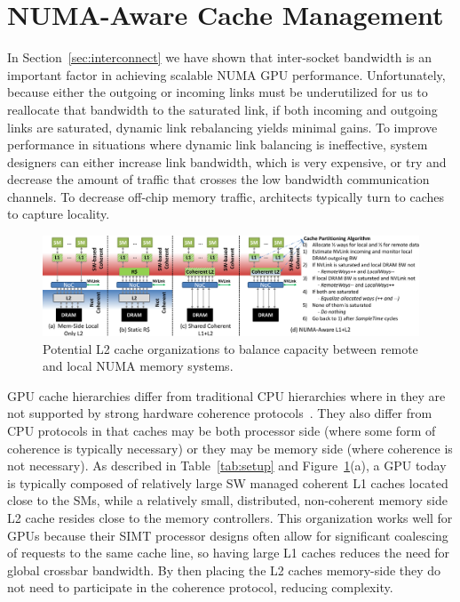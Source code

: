 \vspace{-0.1in}
\section{NUMA-Aware Cache Management}
\label{sec:caches}
In Section~\ref{sec:interconnect} we have shown that inter-socket bandwidth is an
important factor in achieving scalable NUMA GPU performance.
Unfortunately, because either the outgoing or incoming links must be underutilized
for us to reallocate that bandwidth to the saturated link, if both incoming and
outgoing links are saturated, dynamic link rebalancing yields minimal gains.
To improve performance in situations where dynamic link balancing is ineffective,
system designers can either increase link bandwidth, which is very expensive,
or try and decrease the amount of traffic that crosses the low bandwidth
communication channels.  To decrease off-chip memory traffic, architects typically
turn to caches to capture locality.

\begin{figure}[t]
    \centering
    \includegraphics[width=1.0\textwidth]{figures/cache_configurations_static_dynamic.pdf}
    \caption{Potential L2 cache organizations to balance capacity between remote and
    local NUMA memory systems.}
    \label{fig:cacheorg}
            \vspace{-.2in}
\end{figure}

GPU cache hierarchies differ from traditional CPU hierarchies where in they 
are not supported by strong hardware coherence protocols~\cite{singh2013cache}. 
They also differ from CPU protocols in that caches may be both processor side 
(where some form of 
coherence is typically necessary) or they may be memory side (where coherence 
is not necessary).  As described in Table~\ref{tab:setup} and
Figure~\ref{fig:cacheorg}(a), a GPU today is typically composed of relatively 
large SW managed coherent L1 caches located close to the SMs, while a relatively small, 
distributed, 
non-coherent memory side L2 cache resides close to the memory controllers.  
This organization works well for GPUs 
because their SIMT processor designs often allow for significant coalescing 
of requests to the same cache line, so having large L1 caches reduces the 
need for global crossbar bandwidth.  By then placing the L2 caches 
memory-side they do not need to participate in the coherence protocol, reducing
complexity.

